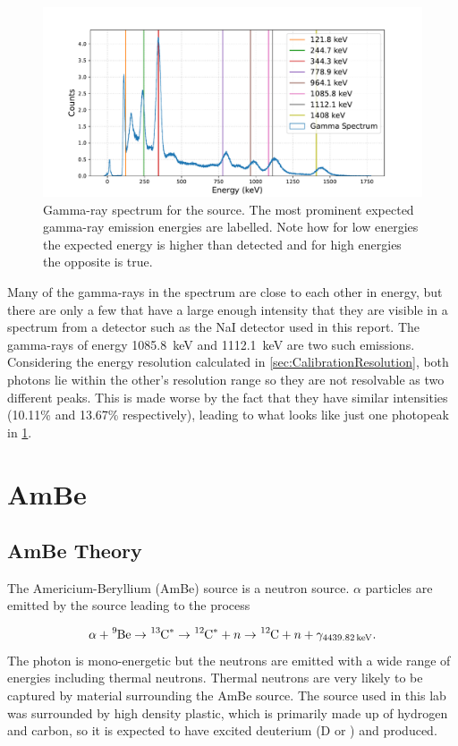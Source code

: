 \documentclass[11pt]{article}
\numberwithin{equation}{section}
\numberwithin{figure}{section}
\numberwithin{table}{section}
\begin{document}
\begin{figure}[h]
    \begin{center}
        \includegraphics[width=.8\textwidth]{Plots/eu.pdf}
        \caption{Gamma-ray spectrum for the  source. The most prominent expected gamma-ray emission energies are labelled. Note how for low energies the expected energy is higher than detected and for high energies the opposite is true.}
        \label{fig:Eu_Spectrum}
    \end{center}
\end{figure}

Many of the gamma-rays in the  spectrum are close to each other in energy, but there are only a few that have a large enough intensity that they are visible in a spectrum from a detector such as the NaI detector used in this report. The gamma-rays of energy \SI{1085.8}{\kilo\electronvolt} and \SI{1112.1}{\kilo\electronvolt} are two such emissions. Considering the energy resolution calculated in \cref{sec:CalibrationResolution}, both photons lie within the other's resolution range so they are not resolvable as two different peaks. This is made worse by the fact that they have similar intensities (10.11\% and 13.67\% respectively), leading to what looks like just one photopeak in \cref{fig:Eu_Spectrum}.

\section{AmBe}\label{sec:AmBe}

\subsection{AmBe Theory}
The Americium-Beryllium (AmBe) source is a neutron source. $\alpha$ particles are emitted by the  source leading to the process

\begin{equation}
    \alpha + \ce{^{9}Be} \rightarrow \ce{^{13}C^*} \rightarrow \ce{^{12}C^*}+n \rightarrow \ce{^{12}C}+n+\gamma_{\SI{4439.82}{\kilo\electronvolt}}.
    \label{eqn:AmBeProcess}
\end{equation}
The photon is mono-energetic but the neutrons are emitted with a wide range of energies including thermal neutrons. Thermal neutrons are very likely to be captured by material surrounding the AmBe source. The source used in this lab was surrounded by high density plastic, which is primarily made up of hydrogen and carbon, so it is expected to have excited deuterium (D or ) and  produced. 
\end{document}
